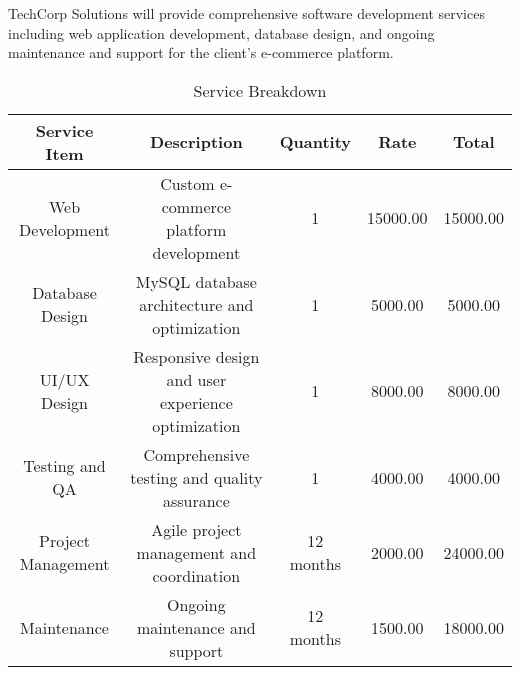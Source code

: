 \documentclass[a4paper,11pt]{article}
\begin{document}
\begin{tcolorbox}[
    colback=blue!5!white,
    colframe=blue!75!black,
    title=Scope of Work,
    fonttitle=\bfseries
]
TechCorp Solutions will provide comprehensive software development services including web application development, database design, and ongoing maintenance and support for the client's e-commerce platform.
\end{tcolorbox} 

\vspace{0.5cm}


\begin{table}[h]
    \centering
    \renewcommand{\arraystretch}{1.2}
    \begin{tabular}{c|c|c|c|c}
        \toprule
        \textbf{Service Item} &\textbf{Description} &\textbf{Quantity} &\textbf{Rate} &\textbf{Total}  \\
        \midrule
        
        Web Development &Custom e-commerce platform development &1 &15000.00 &15000.00  \\
        
        Database Design &MySQL database architecture and optimization &1 &5000.00 &5000.00  \\
        
        UI/UX Design &Responsive design and user experience optimization &1 &8000.00 &8000.00  \\
        
        Testing and QA &Comprehensive testing and quality assurance &1 &4000.00 &4000.00  \\
        
        Project Management &Agile project management and coordination &12 months &2000.00 &24000.00  \\
        
        Maintenance &Ongoing maintenance and support &12 months &1500.00 &18000.00  \\
        
        \bottomrule
    \end{tabular}
    \caption{Service Breakdown}
\end{table} 

\vspace{0.5cm}
\end{document}
